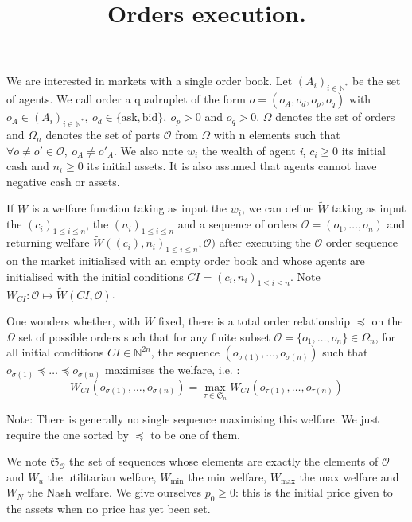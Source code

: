 \documentclass[a4paper]{article}
\title{Orders execution.}
\author{}
\date{}
\newcommand{\N}{\mathbb{N}}
\newcommand{\Sg}{\mathfrak{S}}
\newcommand{\Oc}{\mathcal{O}}
\newtheorem[style=S, bodystyle=\noindent]{thm}{Theorem}[section]
\newtheorem[style=S, bodystyle=\noindent]{defn}[thm]{Definition}
\newtheorem[style=S, bodystyle=\noindent]{propo}[thm]{Proposition}
\newtheorem[style=S, bodystyle=\noindent]{prop}[thm]{Property}
\newtheorem[style=S, bodystyle=\noindent]{coro}[thm]{Corollary}
\newtheorem[style=S, bodystyle=\noindent]{lem}[thm]{Lemma}
\newtheorem[style=S, headstyle=\bfseries\boldmath Theorem, bodystyle=\noindent]{thm*}{Theorem}
\newtheorem[style=S, headstyle=\bfseries\boldmath Definition, bodystyle=\noindent]{defn*}{Definition}
\newtheorem[style=S, headstyle=\bfseries\boldmath Proposition, bodystyle=\noindent]{propo*}{Proposition}
\newtheorem[style=S, headstyle=\bfseries\boldmath Property, bodystyle=\noindent]{prop*}{Property}
\newtheorem[style=S, headstyle=\bfseries\boldmath Corollary, bodystyle=\noindent]{coro*}{Corollary}
\newtheorem[style=S, headstyle=\bfseries\boldmath Lemma, bodystyle=\noindent]{lem*}{Lemma}
\begin{document}
\pagestyle{fancy}
\maketitle

\paragraph{}
We are interested in markets with a single order book. Let $(A_i)_{i\in\N^*}$ be the set of agents. We call order a quadruplet of the form $o = (o_A, o_d, o_p, o_q)$ with $o_A \in (A_i)_{i\in\N^*},~o_d \in \{\text{ask},\text{bid}\},~o_p>0$ and $o_q>0$. $\Omega$ denotes the set of orders and $\Omega_n$ denotes the set of parts $\Oc$ from $\Omega$ with n elements such that $\forall o \neq o' \in \Oc,~o_A \neq o'_A$. We also note $w_i$ the wealth of agent \textit{i}, $c_i \geq 0$ its initial cash and $n_i \geq 0$ its initial assets. It is also assumed that agents cannot have negative cash or assets.
\par
If $W$ is a welfare function taking as input the $w_i$, we can define $\tilde W$ taking as input the $(c_i)_{1\leq i\leq n}$, the $(n_i)_{1\leq i\leq n}$ and a sequence of orders $\Oc = (o_1, \ldots, o_n)$ and returning welfare $\tilde W((c_i), n_i)_{1\leq i\leq n}, \Oc)$ after executing the $\Oc$ order sequence on the market initialised with an empty order book and whose agents are initialised with the initial conditions $CI = (c_i, n_i)_{1\leq i\leq n}$. Note $W_{CI} : \Oc \mapsto \tilde W(CI, \Oc)$.


\par
One wonders whether, with $W$ fixed, there is a total order relationship $\preceq$ on the $\Omega$ set of possible orders such that for any finite subset $\Oc = \{o_1, \ldots, o_n\} \in \Omega_n$, for all initial conditions $CI \in \N^{2n}$, the sequence $(o_{\sigma(1)}, \ldots, o_{\sigma(n)})$ such that $o_{\sigma(1)} \preceq \ldots \preceq o_{\sigma(n)}$ maximises the welfare, i.e. : \\
\[W_{CI}(o_{\sigma(1)}, \ldots, o_{\sigma(n)}) = \max_{\tau \in \Sg_n}W_{CI}(o_{\tau(1)}, \ldots, o_{\tau(n)})\]


\par
Note: There is generally no single sequence maximising this welfare. We just require the one sorted by $\preceq$ to  be one of them.

\par We note $\Sg_\Oc$ the set of sequences whose elements are exactly the elements of $\Oc$ and $W_u$ the utilitarian welfare, $W_{\min}$ the min welfare, $W_{\max}$ the max welfare and $W_N$ the Nash welfare. We give ourselves $p_0 \geq 0$: this is the initial price given to the assets when no price has yet been set.
\end{document}
